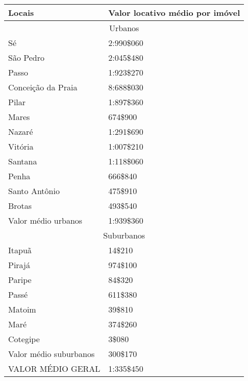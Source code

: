\begin{table}[!htp]
{
\begin{tabular}{ll}
\hline
Locais	&Valor locativo médio por imóvel\\
\hline
\hline
\multicolumn{2}{c}{Urbanos}\\
\hline
Sé	&2:990\$060\\
São Pedro	&2:045\$480\\
Passo	&1:923\$270\\
Conceição da Praia	&8:688\$030\\
Pilar	&1:897\$360\\
Mares	&674\$900\\
Nazaré	&1:291\$690\\
Vitória	&1:007\$210\\
Santana	&1:118\$060\\
Penha	&666\$840\\
Santo Antônio	&475\$910\\
Brotas	&493\$540\\
Valor médio urbanos	&1:939\$360\\
\hline
\multicolumn{2}{c}{Suburbanos}\\
\hline
Itapuã	&14\$210\\
Pirajá	&974\$100\\
Paripe	&84\$320\\
Passé	&611\$380\\
Matoim	&39\$810\\
Maré	&374\$260\\
Cotegipe	&3\$080\\
Valor médio suburbanos	&300\$170\\
\hline
VALOR MÉDIO GERAL	&1:335\$450\\
\hline
\end{tabular} 
}
{}
\end{table}